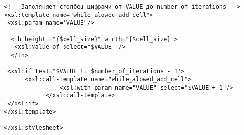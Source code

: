 \begin{verbatim}
<!-- Заполяняет столбец цифрами от VALUE до number_of_iterations -->
<xsl:template name="while_alowed_add_cell">
 <xsl:param name="VALUE"/>

  <th height ="{$cell_size}" width="{$cell_size}"> 
   <xsl:value-of select="$VALUE" /> 
  </th>

 <xsl:if test="$VALUE != $number_of_iterations - 1">
      <xsl:call-template name="while_alowed_add_cell">
				<xsl:with-param name="VALUE" select="$VALUE + 1"/>
			</xsl:call-template>
 </xsl:if>
</xsl:template>

</xsl:stylesheet> 

\end{verbatim}